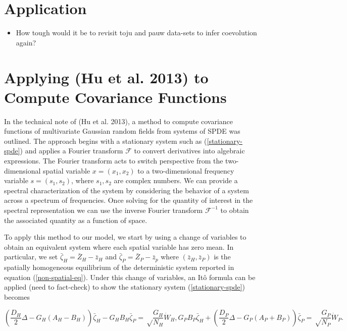\documentclass{article}
\begin{document}
\hypertarget{application}{%
\section{Application}\label{application}}

\begin{itemize}
\tightlist
\item
  How tough would it be to revisit toju and pauw data-sets to infer
  coevolution again?
\end{itemize}

\newpage

\hypertarget{applying-hu2013multivariate-to-compute-covariance-functions}{%
\section{Applying (Hu et al. 2013) to Compute Covariance
Functions}\label{applying-hu2013multivariate-to-compute-covariance-functions}}

In the technical note of (Hu et al. 2013), a method to compute
covariance functions of multivariate Gaussian random fields from systems
of SPDE was outlined. The approach begins with a stationary system such
as (\ref{stationary-spde}) and applies a Fourier transform
\(\mathcal F\) to convert derivatives into algebraic expressions. The
Fourier transform acts to switch perspective from the two-dimensional
spatial variable \(x=(x_1,x_2)\) to a two-dimensional frequency variable
\(s=(s_1,s_2)\), where \(s_1,s_2\) are complex numbers. We can provide a
spectral characterization of the system by considering the behavior of a
system across a spectrum of frequencies. Once solving for the quantity
of interest in the spectral representation we can use the inverse
Fourier transform \(\mathcal F^{-1}\) to obtain the associated quantity
as a function of space.

To apply this method to our model, we start by using a change of
variables to obtain an equivalent system where each spatial variable has
zero mean. In particular, we set \(\bar\zeta_H=\bar Z_H-\bar z_H\) and
\(\bar\zeta_P=\bar Z_P-\bar z_p\) where \((\bar z_H,\bar z_P)\) is the
spatially homogeneous equilibrium of the deterministic system reported
in equation (\ref{non-spatial-eq}). Under this change of variables, an
Itô formula can be applied (need to fact-check) to show the stationary
system (\ref{stationary-spde}) becomes

\begin{subequations}
  \begin{equation}
    \left(\frac{D_H}{2}\Delta-G_H(A_H-B_H)\right)\bar\zeta_H-G_HB_H\bar\zeta_P=\sqrt\frac{G_H}{N_H}\dot W_H,
  \end{equation}
  \begin{equation}
    G_PB_P\bar \zeta_H+\left(\frac{D_P}{2}\Delta-G_P(A_P+B_P)\right)\bar\zeta_P=\sqrt\frac{G_P}{N_P}\dot W_P.
  \end{equation}
\end{subequations}
\end{document}
